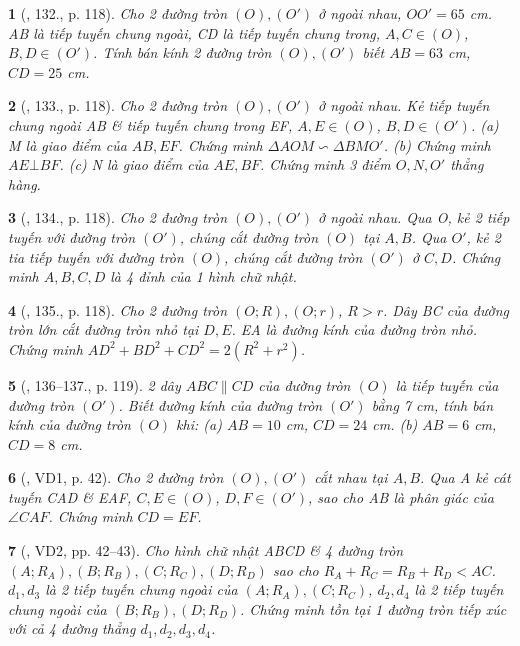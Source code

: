 \documentclass{article}
\newtheorem{baitoan}{}
\begin{document}
\begin{baitoan}[\cite{Binh_Toan_9_tap_1}, 132., p. 118]
	Cho 2 đường tròn $(O),(O')$ ở ngoài nhau, $OO' = 65$ {\rm cm}. AB là tiếp tuyến chung ngoài, CD là tiếp tuyến chung trong, $A,C\in(O)$, $B,D\in(O')$. Tính bán kính 2 đường tròn $(O),(O')$ biết $AB = 63$ {\rm cm}, $CD = 25$ {\rm cm}.
\end{baitoan}

\begin{baitoan}[\cite{Binh_Toan_9_tap_1}, 133., p. 118]
	Cho 2 đường tròn $(O),(O')$ ở ngoài nhau. Kẻ tiếp tuyến chung ngoài AB \& tiếp tuyến chung trong EF, $A,E\in(O)$, $B,D\in(O')$. (a) M là giao điểm của $AB,EF$. Chứng minh $\Delta AOM\backsim\Delta BMO'$. (b) Chứng minh $AE\bot BF$. (c) N là giao điểm của $AE,BF$. Chứng minh 3 điểm $O,N,O'$ thẳng hàng.
\end{baitoan}

\begin{baitoan}[\cite{Binh_Toan_9_tap_1}, 134., p. 118]
	Cho 2 đường tròn $(O),(O')$ ở ngoài nhau. Qua O, kẻ 2 tiếp tuyến với đường tròn $(O')$, chúng cắt đường tròn $(O)$ tại $A,B$. Qua $O'$, kẻ 2 tia tiếp tuyến với đường tròn $(O)$, chúng cắt đường tròn $(O')$ ở $C,D$. Chứng minh $A,B,C,D$ là 4 đỉnh của 1 hình chữ nhật.
\end{baitoan}

\begin{baitoan}[\cite{Binh_Toan_9_tap_1}, 135., p. 118]
	Cho 2 đường tròn $(O;R),(O;r)$, $R > r$. Dây BC của đường tròn lớn cắt đường tròn nhỏ tại $D,E$. EA là đường kính của đường tròn nhỏ. Chứng minh $AD^2 + BD^2 + CD^2 = 2(R^2 + r^2)$.
\end{baitoan}

\begin{baitoan}[\cite{Binh_Toan_9_tap_1}, 136--137., p. 119]
	2 dây $ABC\parallel CD$ của đường tròn $(O)$ là tiếp tuyến của đường tròn $(O')$. Biết đường kính của đường tròn $(O')$ bằng {\rm7 cm}, tính bán kính của đường tròn $(O)$ khi: (a) $AB = 10$ {\rm cm}, $CD = 24$ {\rm cm}. (b) $AB = 6$ {\rm cm}, $CD = 8$ {\rm cm}.
\end{baitoan}

\begin{baitoan}[\cite{TLCT_THCS_Toan_9_hinh_hoc}, VD1, p. 42]
	Cho 2 đường tròn $(O),(O')$ cắt nhau tại $A,B$. Qua A kẻ cát tuyến CAD \& EAF, $C,E\in(O)$, $D,F\in(O')$, sao cho AB là phân giác của $\angle{CAF}$. Chứng minh $CD = EF$.
\end{baitoan}

\begin{baitoan}[\cite{TLCT_THCS_Toan_9_hinh_hoc}, VD2, pp. 42--43]
	Cho hình chữ nhật ABCD \& 4 đường tròn $(A;R_A),(B;R_B),(C;R_C),(D;R_D)$ sao cho $R_A + R_C = R_B + R_D < AC$. $d_1,d_3$ là 2 tiếp tuyến chung ngoài của $(A;R_A),(C;R_C)$, $d_2,d_4$ là 2 tiếp tuyến chung ngoài của $(B;R_B),(D;R_D)$. Chứng minh tồn tại 1 đường tròn tiếp xúc với cả 4 đường thẳng $d_1,d_2,d_3,d_4$.
\end{baitoan}
\end{document}
